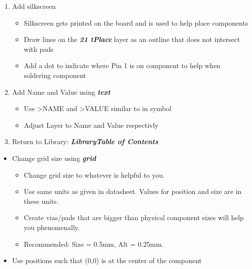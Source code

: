 \documentclass{article}
\begin{document}
\begin{enumerate}
    \item Add silkscreen
    \begin{itemize}
        \item Silkscreen gets printed on the board and is used to help place components
        \item Draw lines on the \textit{\textbf{21 tPlace}} layer as an outline that does not intersect with pads
        \item Add a dot to indicate where Pin 1 is on component to help when soldering component
    \end{itemize}
    \item Add Name and Value using \textit{\textbf{text}}
    \begin{itemize}
        \item Use \textgreater NAME and  \textgreater VALUE similar to in symbol
        \item Adjust Layer to Name and Value respectivly
    \end{itemize}
    \item Return to Library: \textit{\textbf{Library\textrightarrow Table
    of Contents}}
\end{enumerate}
\begin{tcolorbox} [title=Tips \& Tricks]
    \begin{itemize}
        \item Change grid size using \textit{\textbf{grid}}
        \begin{itemize}
            \item Change grid size to whatever is helpful to you.
            \item Use same units as given in datasheet. Values for position and size are in these units.
            \item Create vias/pads that are bigger than physical component sizes will help you phenomenally.
            \item Recommended: Size = 0.5mm, Alt = 0.25mm.
        \end{itemize}
        \item Use positions such that (0,0) is at the center of the component
    \end{itemize}
\end{tcolorbox}
\end{document}
